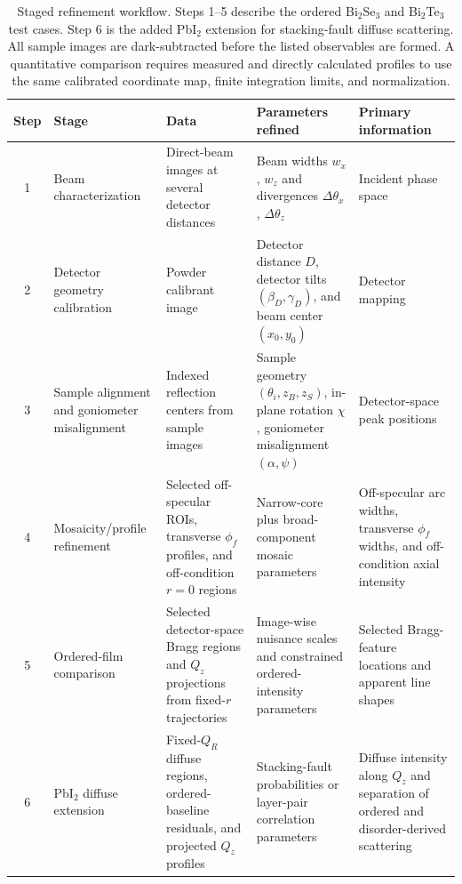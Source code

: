 \begin{table}[!ht]
  \centering
  \caption{Staged refinement workflow. Steps 1--5 describe the ordered Bi$_2$Se$_3$ and Bi$_2$Te$_3$ test cases. Step 6 is the added PbI$_2$ extension for stacking-fault diffuse scattering. All sample images are dark-subtracted before the listed observables are formed. A quantitative comparison requires measured and directly calculated profiles to use the same calibrated coordinate map, finite integration limits, and normalization.}
  \label{tab:refinement_workflow}
  \scriptsize
  \setlength{\tabcolsep}{3pt}
  \renewcommand{\arraystretch}{1.08}
  \begin{tabularx}{\linewidth}{@{}c >{\raggedright\arraybackslash}p{2.45cm} >{\raggedright\arraybackslash}X >{\raggedright\arraybackslash}X >{\raggedright\arraybackslash}p{2.75cm}@{}}
    \toprule
    Step & Stage & Data & Parameters refined & Primary information \\
    \midrule
    1 &
    Beam characterization &
    Direct-beam images at several detector distances &
    Beam widths $w_x$, $w_z$ and divergences $\Delta\theta_x$, $\Delta\theta_z$ &
    Incident phase space \\
    2 &
    Detector geometry calibration &
    Powder calibrant image &
    Detector distance $D$, detector tilts $(\beta_D,\gamma_D)$, and beam center $(x_0,y_0)$ &
    Detector mapping \\
    3 &
    Sample alignment and goniometer misalignment &
    Indexed reflection centers from sample images &
    Sample geometry $(\theta_i,z_B,z_S)$, in-plane rotation $\chi$, goniometer misalignment $(\alpha,\psi)$ &
    Detector-space peak positions \\
    4 &
    Mosaicity/profile refinement &
    Selected off-specular ROIs, transverse $\phi_f$ profiles, and off-condition $r=0$ regions &
    Narrow-core plus broad-component mosaic parameters &
    Off-specular arc widths, transverse $\phi_f$ widths, and off-condition axial intensity \\
    5 &
    Ordered-film comparison &
    Selected detector-space Bragg regions and $Q_z$ projections from fixed-$r$ trajectories &
    Image-wise nuisance scales and constrained ordered-intensity parameters &
    Selected Bragg-feature locations and apparent line shapes \\
    6 &
    PbI$_2$ diffuse extension &
    Fixed-$Q_R$ diffuse regions, ordered-baseline residuals, and projected $Q_z$ profiles &
    Stacking-fault probabilities or layer-pair correlation parameters &
    Diffuse intensity along $Q_z$ and separation of ordered and disorder-derived scattering \\
    \bottomrule
  \end{tabularx}
\end{table}

